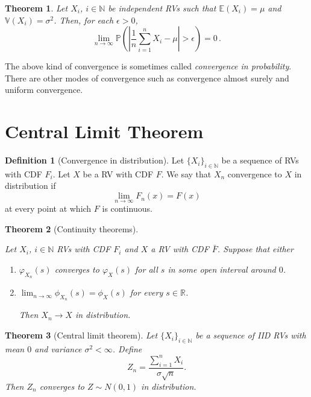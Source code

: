 \documentclass[
  openany]{book}
\newtheorem{theorem}{Theorem}[chapter]
\theoremstyle{definition}
\newtheorem{definition}{Definition}[chapter]
\theoremstyle{definition}
\theoremstyle{definition}
\theoremstyle{definition}
\theoremstyle{remark}
\begin{document}
\begin{theorem}
Let \(X_i\), \(i\in \mathbb{N}\) be independent RVs such that \(\mathbb{E}(X_i) = \mu\)
and \(\mathbb{V}(X_i) = \sigma^2\).
Then, for each \(\epsilon > 0\),
\[ \lim_{n\to \infty} \mathbb{P}\left( \left| \frac{1}{n} \sum_{i=1}^n X_i - \mu  \right| > \epsilon   \right) = 0 \,.\]
\end{theorem}

The above kind of convergence is sometimes called \emph{convergence in probability}.
There are other modes of convergence such as convergence almost surely and
uniform convergence.

\section{Central Limit Theorem}\label{central-limit-theorem}

\begin{definition}[Convergence in distribution]
Let \(\{X_i\}_{i \in \mathbb{N}}\) be a sequence of RVs with CDF \(F_i\).
Let \(X\) be a RV with CDF \(F\).
We say that \(X_n\) convergence to \(X\) in distribution if
\[ \lim_{n\to \infty} F_n (x) = F(x) \] at every point at which \(F\) is continuous.
\end{definition}

\begin{theorem}[Continuity theorems]
\protect\hypertarget{thm:cont}{}\label{thm:cont}

Let \(X_i\), \(i \in \mathbb{N}\) RVs with CDF \(F_i\) and \(X\) a RV with CDF \(\bar F\).
Suppose that either

\begin{enumerate}
\def\labelenumi{\arabic{enumi}.}
\item
  \(\varphi_{X_n}(s)\) converges to \(\varphi_X(s)\) for all \(s\) in some open interval around \(0\).
\item
  \(\lim_{n\to\infty} \phi_{X_n}(s) =  \phi_X(s)\) for every \(s \in \mathbb{R}\).

  Then \(X_n \to X\) in distribution.
\end{enumerate}

\end{theorem}

\begin{theorem}[Central limit theorem]
Let \(\{ X_i \}_{i\in \mathbb{N}}\) be a sequence of IID RVs with mean \(0\) and
variance \(\sigma^2 < \infty\).
Define
\[ Z_n = \frac{\sum_{i=1}^n X_i}{\sigma \sqrt{n}}. \]
Then \(Z_n\) converges to \(Z \sim N(0,1)\) in distribution.
\end{theorem}
\end{document}
